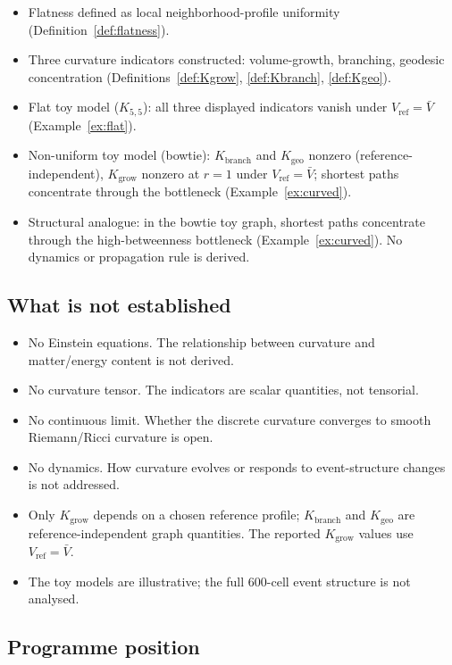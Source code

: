 \documentclass[12pt]{article}
\begin{document}
\begin{itemize}
    \item Flatness defined as local neighborhood-profile uniformity (Definition~\ref{def:flatness}).
    \item Three curvature indicators constructed: volume-growth, branching, geodesic concentration (Definitions~\ref{def:Kgrow}, \ref{def:Kbranch}, \ref{def:Kgeo}).
    \item Flat toy model ($K_{5,5}$): all three displayed indicators vanish under $V_{\mathrm{ref}} = \bar V$ (Example~\ref{ex:flat}).
    \item Non-uniform toy model (bowtie): $K_{\mathrm{branch}}$ and $K_{\mathrm{geo}}$ nonzero (reference-independent), $K_{\mathrm{grow}}$ nonzero at $r=1$ under $V_{\mathrm{ref}} = \bar V$; shortest paths concentrate through the bottleneck (Example~\ref{ex:curved}).
    \item Structural analogue: in the bowtie toy graph, shortest paths concentrate through the high-betweenness bottleneck (Example~\ref{ex:curved}). No dynamics or propagation rule is derived.
\end{itemize}

\subsection{What is not established}

\begin{itemize}
    \item No Einstein equations. The relationship between curvature and matter/energy content is not derived.
    \item No curvature tensor. The indicators are scalar quantities, not tensorial.
    \item No continuous limit. Whether the discrete curvature converges to smooth Riemann/Ricci curvature is open.
    \item No dynamics. How curvature evolves or responds to event-structure changes is not addressed.
    \item Only $K_{\mathrm{grow}}$ depends on a chosen reference profile; $K_{\mathrm{branch}}$ and $K_{\mathrm{geo}}$ are reference-independent graph quantities. The reported $K_{\mathrm{grow}}$ values use $V_{\mathrm{ref}} = \bar V$.
    \item The toy models are illustrative; the full 600-cell event structure is not analysed.
\end{itemize}

\subsection{Programme position}
\end{document}
